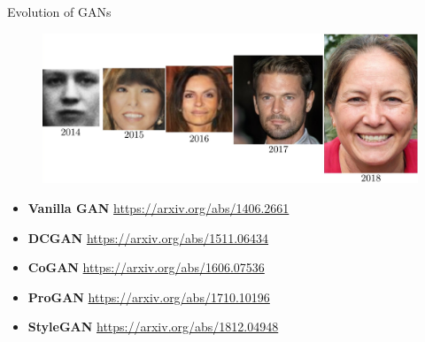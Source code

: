 

\begin{frame}
\titlepage
\end{frame}
\begin{frame}{Evolution of GANs}
	\begin{figure}
		\centering
		\includegraphics[width=\linewidth]{figs/gan_evolution}
	\end{figure}
	\begin{itemize}
		\item \textbf{Vanilla GAN} \href{https://arxiv.org/abs/1406.2661}{https://arxiv.org/abs/1406.2661}
		\item \textbf{DCGAN} \href{https://arxiv.org/abs/1511.06434}{https://arxiv.org/abs/1511.06434}
		\item \textbf{CoGAN} \href{https://arxiv.org/abs/1606.07536}{https://arxiv.org/abs/1606.07536}
		\item \textbf{ProGAN} \href{https://arxiv.org/abs/1710.10196}{https://arxiv.org/abs/1710.10196} 
		\item \textbf{StyleGAN} \href{https://arxiv.org/abs/1812.04948}{https://arxiv.org/abs/1812.04948}
	\end{itemize}
\end{frame}
